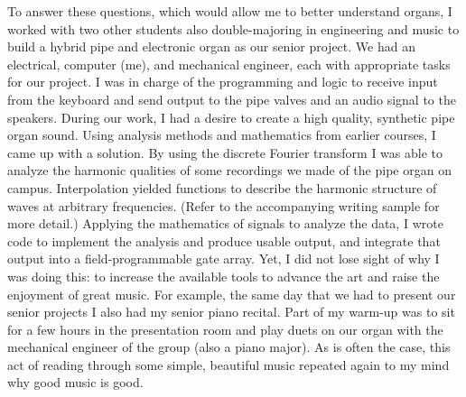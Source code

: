 \documentclass[12pt]{article}
\begin{document}
To answer these questions, which would allow me to better understand organs, I worked with two other students also double-majoring in engineering and music to build a hybrid pipe and electronic organ as our senior project. We had an electrical, computer (me), and mechanical engineer, each with appropriate tasks for our project. I was in charge of the programming and logic to receive input from the keyboard and send output to the pipe valves and an audio signal to the speakers. During our work, I had a desire to create a high quality, synthetic pipe organ sound. Using analysis methods and mathematics from earlier courses, I came up with a solution. By using the discrete Fourier transform I was able to analyze the harmonic qualities of some recordings we made of the pipe organ on campus. Interpolation yielded functions to describe the harmonic structure of waves at arbitrary frequencies. (Refer to the accompanying writing sample for more detail.) Applying the mathematics of signals to analyze the data, I wrote code to implement the analysis and produce usable output, and integrate that output into a field-programmable gate array. Yet, I did not lose sight of why I was doing this: to increase the available tools to advance the art and raise the enjoyment of great music. For example, the same day that we had to present our senior projects I also had my senior piano recital. Part of my warm-up was to sit for a few hours in the presentation room and play duets on our organ with the mechanical engineer of the group (also a piano major). As is often the case, this act of reading through some simple, beautiful music repeated again to my mind why good music is good.
\end{document}
